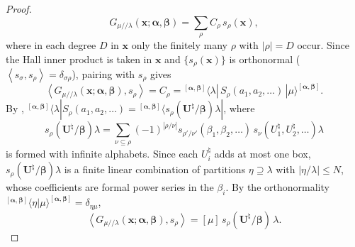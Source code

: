 \documentclass[11pt]{amsart}
\numberwithin{equation}{section}
\theoremstyle{definition}
\theoremstyle{remark}
\newcommand{\bfU}{\mathbf U}
\newcommand{\bbeta}{\boldsymbol\beta}
\newcommand{\balpha}{\boldsymbol\alpha}
\newcommand{\Hall}[2]{\left\langle #1,#2\right\rangle}
\newcommand{\sk}{/\!\!/}
\begin{document}
\begin{proof}
\[ G_{\mu\sk\lambda}(\mathbf x;\balpha,\bbeta)=\sum_\rho C_\rho\,s_\rho(\mathbf x),
\]
where in each degree $D$ in $\mathbf x$ only the finitely many $\rho$ with
$|\rho|=D$ occur. Since the Hall inner product is taken in $\mathbf x$ and
$\{s_\rho(\mathbf x)\}$ is orthonormal ($\Hall{s_\sigma}{s_\rho}=\delta_{\sigma\rho}$),
pairing with $s_\rho$ gives
\[
 \Hall{G_{\mu\sk\lambda}(\mathbf x;\balpha,\bbeta)}{s_\rho}
 =C_\rho
 ={}^{[\balpha,\bbeta]}\langle\lambda|\,S_\rho(a_1,a_2,\dots)\,|\mu\rangle^{[\balpha,\bbeta]}.
\]
By \cite[Thm.~3.2]{IMS25},
${}^{[\balpha,\bbeta]}\langle\lambda|S_\rho(a_1,a_2,\dots)
={}^{[\balpha,\bbeta]}\langle s_\rho(\bfU^\natural/\bbeta)\lambda|$, where
\begin{equation}\label{eq:super}
 s_\rho(\bfU^\natural/\bbeta)\lambda
 =\sum_{\nu\subseteq\rho}(-1)^{|\rho/\nu|}s_{\rho'/\nu'}(\beta_1,\beta_2,\dots)\,
 s_\nu(U^\natural_1,U^\natural_2,\dots)\lambda
\end{equation}
is formed with infinite alphabets. Since each $U^\natural_i$ adds at most one
box, $s_\rho(\bfU^\natural/\bbeta)\lambda$ is a finite linear combination of
partitions $\eta\supseteq\lambda$ with $|\eta/\lambda|\leq N$, whose
coefficients are formal power series in the $\beta_i$. By the orthonormality
${}^{[\balpha,\bbeta]}\langle\eta|\mu\rangle^{[\balpha,\bbeta]}=\delta_{\eta\mu}$,
\begin{equation}\label{eq:refined-identity}
 \Hall{G_{\mu\sk\lambda}(\mathbf x;\balpha,\bbeta)}{s_\rho}
 =[\mu]\,s_\rho(\bfU^\natural/\bbeta)\,\lambda .
\end{equation}


\end{proof}
\end{document}
